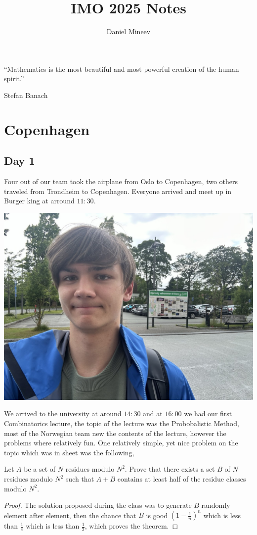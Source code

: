 \documentclass{article}
\title{IMO 2025 Notes}
\author{Daniel Mineev}
\date{}
\begin{document}
\maketitle

\epigraph{“Mathematics is the most beautiful and most powerful creation of the human spirit.”}{Stefan Banach}

\section{Copenhagen}

\subsection{Day 1}

Four out of our team took the airplane from Oslo to Copenhagen, two others traveled from Trondheim to Copenhagen. Everyone arrived and meet up in Burger king at arround \(11:30\).

\begin{center}
\includegraphics[scale=0.2]{assets/soro.jpg}
\end{center}

We arrived to the university at around \(14:30\) and at \(16:00\) we had our first Combinatorics lecture, the topic of the lecture was the Probobalistic Method, most of the Norwegian team new the contents of the lecture, however the problems where relatively fun. One relatively simple, yet nice problem on the topic which was in sheet was the following,

\begin{problem}
  Let \(A\) be a set of \(N\) residues modulo \(N^2\). Prove that there exists a set \(B\) of \(N\) residues modulo \(N^2\) such that \(A + B\) contains at least half of the residue classes modulo \(N^2\).
\end{problem}
\begin{proof}
The solution proposed during the class was to generate \(B\) randomly element after element, then the chance that \(B\) is good \(\left( 1 - \frac{1}{n} \right)^n\) which is less than \(\frac{1}{e}\) which is less than \(\frac{1}{2}\), which proves the theorem.
\end{proof}
\end{document}
